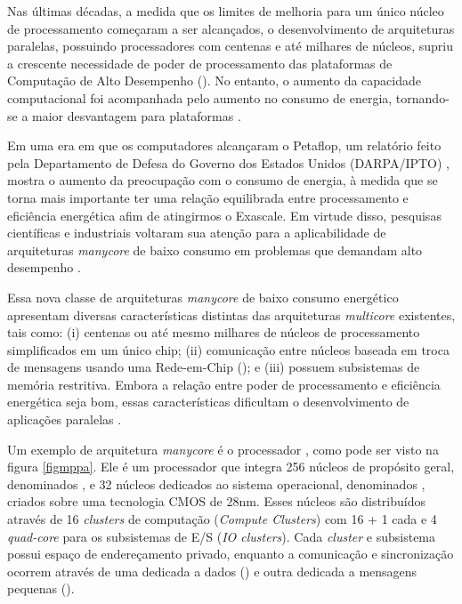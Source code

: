 \documentclass[
	12pt,				%
	openright,			%
	twoside,			%
	a4paper,			%
	english,			%
	brazil,				%
	]{abntex2}
\begin{document}
Nas últimas décadas, a medida que os limites de melhoria para um único núcleo de processamento começaram a ser alcançados, o desenvolvimento de arquiteturas paralelas, possuindo processadores com centenas e até milhares de núcleos, supriu a crescente necessidade de poder de processamento das plataformas de Computação de Alto Desempenho (\hpc).
No entanto, o aumento da capacidade computacional foi acompanhada pelo aumento no consumo de energia, tornando-se a maior desvantagem para plataformas \hpc.

Em uma era em que os computadores alcançaram o Petaflop, um relatório feito pela Departamento de Defesa do Governo dos Estados Unidos (DARPA/IPTO) \cite{darpa:exascale}, mostra o aumento da preocupação com o consumo de energia, à medida que se torna mais importante ter uma relação equilibrada entre processamento e eficiência energética afim de atingirmos o Exascale. Em virtude disso, pesquisas científicas e industriais voltaram sua atenção para a aplicabilidade de arquiteturas \textit{manycore} de baixo consumo em problemas que demandam alto desempenho \cite{Castro-SBAC-PAD:2014, Castro-PARCO:2016}.

Essa nova classe de arquiteturas \textit{manycore} de baixo consumo energético apresentam diversas características distintas das arquiteturas \textit{multicore} existentes, tais como: (i) centenas ou até mesmo milhares de núcleos de processamento simplificados em um único chip; (ii) comunicação entre núcleos baseada em troca de mensagens usando uma Rede-em-Chip (\noc); e (iii) possuem subsistemas de memória restritiva.
Embora a relação entre poder de processamento e eficiência energética seja bom, essas características dificultam o desenvolvimento de aplicações paralelas \cite{Castro-Souza-CCPE:2016, Castro-PARCO:2016, os:rmen}.

Um exemplo de arquitetura \textit{manycore} é o processador \mppa  \cite{Castro-IA3:2013}, como pode ser visto na figura \ref{figmppa}. Ele é um processador que integra 256 núcleos de propósito geral, denominados \pe, e 32 núcleos dedicados ao sistema operacional, denominados \rman, criados sobre uma tecnologia CMOS de 28nm. Esses núcleos são distribuídos através de 16 \textit{clusters} de computação (\textit{Compute Clusters}) com 16 \pe + 1 \rman cada e 4 \textit{quad-core} para os subsistemas de E/S (\textit{IO clusters}). Cada \textit{cluster} e subsistema possui espaço de endereçamento privado, enquanto a comunicação e sincronização ocorrem através de uma \noc dedicada a dados (\dnoc) e outra dedicada a mensagens pequenas (\cnoc).
\end{document}

